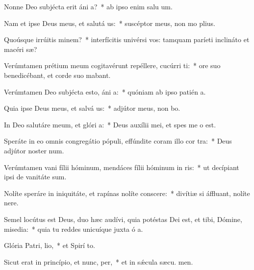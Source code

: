 \item Nonne Deo subjécta erit áni a?~* ab ipso enim salu um.
\item Nam et ipse Deus meus, et salutá us:~* suscéptor meus, non mo plius.
\item Quoúsque irrúitis  minem?~* interfícitis univérsi vos: tamquam paríeti inclináto et macéri sæ?
\item Verúmtamen prétium meum cogitavérunt repéllere, cucúrri  ti:~* ore suo benedicébant, et corde suo mabant.
\item Verúmtamen Deo subjécta esto, áni a:~* quóniam ab ipso patién a.
\item Quia ipse Deus meus, et salvá us:~* adjútor meus, non bo.
\item In Deo salutáre meum, et glóri a:~* Deus auxílii mei, et spes me  o est.
\item Speráte in eo omnis congregátio pópuli, effúndite coram illo cor tra:~* Deus adjútor noster  num.
\item Verúmtamen vani fílii hóminum, mendáces fílii hóminum in ris:~* ut decípiant ipsi de vanitáte  sum.
\item Nolíte speráre in iniquitáte, et rapínas nolíte conscere:~* divítiæ si áffluant, nolíte  nere.
\item Semel locútus est Deus, duo hæc audívi, quia potéstas Dei est, et tibi, Dómine, misedia:~* quia tu reddes unicuíque juxta ó a.
\item Glória Patri,  lio,~* et Spirí to.
\item Sicut erat in princípio, et nunc,  per,~* et in sǽcula sæcu. men.
